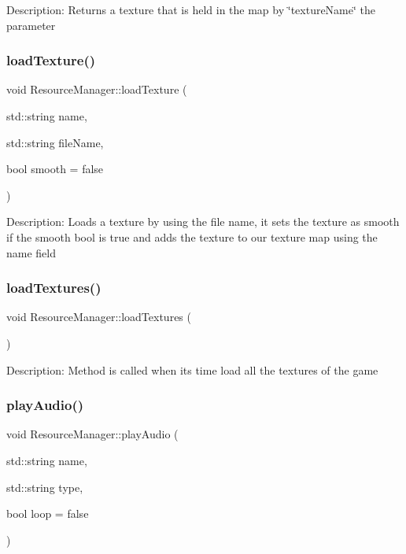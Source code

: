 Description\+: Returns a texture that is held in the map by \char`\"{}texture\+Name\char`\"{} the parameter \mbox{\label{class_resource_manager_a31e9d2aeda022c4cfd5282a0f3dbce68}} 
\subsubsection{\texorpdfstring{loadTexture()}{loadTexture()}}
{\footnotesize\ttfamily void Resource\+Manager\+::load\+Texture (\begin{DoxyParamCaption}\item[{std\+::string}]{name,  }\item[{std\+::string}]{file\+Name,  }\item[{bool}]{smooth = {\ttfamily false} }\end{DoxyParamCaption})}

Description\+: Loads a texture by using the file name, it sets the texture as smooth if the smooth bool is true and adds the texture to our texture map using the name field \mbox{\label{class_resource_manager_a919e53911b0b9609d74a40403e89edb2}} 
\subsubsection{\texorpdfstring{loadTextures()}{loadTextures()}}
{\footnotesize\ttfamily void Resource\+Manager\+::load\+Textures (\begin{DoxyParamCaption}{ }\end{DoxyParamCaption})}

Description\+: Method is called when its time load all the textures of the game \mbox{\label{class_resource_manager_aea954ee26cf7b874b32fcdcf4500d028}} 
\subsubsection{\texorpdfstring{playAudio()}{playAudio()}}
{\footnotesize\ttfamily void Resource\+Manager\+::play\+Audio (\begin{DoxyParamCaption}\item[{std\+::string}]{name,  }\item[{std\+::string}]{type,  }\item[{bool}]{loop = {\ttfamily false} }\end{DoxyParamCaption})}

